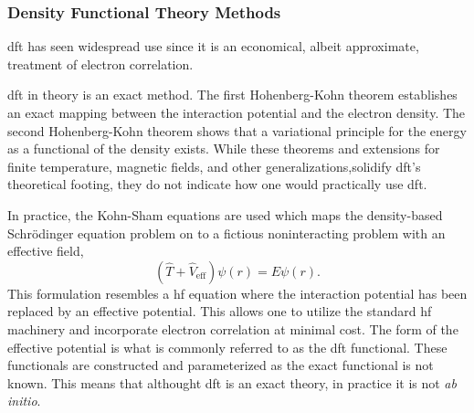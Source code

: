 \subsubsection{Density Functional Theory Methods}
\gls{dft} has seen widespread use since it is an economical, albeit approximate, treatment of electron correlation.\citehere

\gls{dft} in theory is an exact method.
The first Hohenberg-Kohn theorem establishes an exact mapping between the interaction potential and the electron density.\citehere
The second Hohenberg-Kohn theorem shows that a variational principle for the energy as a functional of the density exists.\citehere
While these theorems and extensions for finite temperature, magnetic fields, and other generalizations,\citehere solidify \gls{dft}'s theoretical footing, they do not indicate how one would practically use \gls{dft}.

In practice, the Kohn-Sham equations are used which maps the density-based Schr{\"o}dinger equation problem on to a fictious noninteracting problem with an effective field,
\begin{equation}
(\hat{T} + \hat{V}_{\mathrm{eff}}) \psi(r) = E \psi(r).
\end{equation}
This formulation resembles a \gls{hf} equation where the interaction potential has been replaced by an effective potential.
This allows one to utilize the standard \gls{hf} machinery and incorporate electron correlation at minimal cost.
The form of the effective potential is what is commonly referred to as the \gls{dft} functional.
These functionals are constructed and parameterized as the exact functional is not known.
This means that althought \gls{dft} is an exact theory, in practice it is not \textit{ab initio}.


